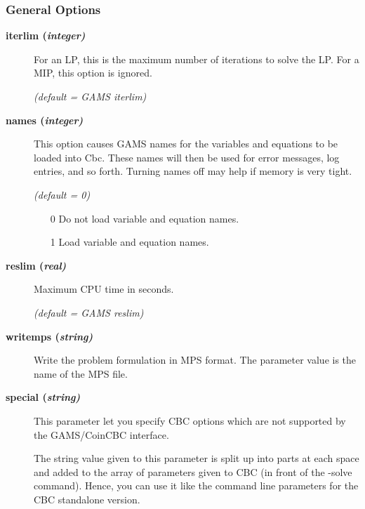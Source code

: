 \subsubsection{General Options}

\begin{description}

\item[\label{iterlim}\hypertarget{iterlim}
{\textbf{iterlim (\slshape{integer})}}]\hspace{1.0in}

For an LP, this is the maximum number of iterations to solve the LP.
For a MIP, this option is ignored.

\textsl{(default = GAMS iterlim)}

\item[\label{names}\hypertarget{names}
{\textbf{names (\slshape{integer})}}]\hspace{1.0in}

This option causes GAMS names for the variables and equations to be loaded into Cbc.
These names will then be used for error messages, log entries, and so forth.
Turning names off may help if memory is very tight.

\textsl{(default = 0)}
\begin{itemize}
\item[0] Do not load variable and equation names.
\item[1] Load variable and equation names.
\end{itemize}

\item[\label{reslim}\hypertarget{reslim}
{\textbf{reslim (\slshape{real})}}]\hspace{1.0in}

Maximum CPU time in seconds.

\textsl{(default = GAMS reslim)}

\item[\label{writemps}\hypertarget{writemps}
{\textbf{writemps (\slshape{string})}}]\hspace{1.0in}

Write the problem formulation in MPS format.
The parameter value is the name of the MPS file.

\item[\label{special}\hypertarget{special}
{\textbf{special (\slshape{string})}}]\hspace{1.0in}

This parameter let you specify CBC options which are not supported by the GAMS/CoinCBC interface.

The string value given to this parameter is split up into parts at each space and added to the array of parameters given to CBC (in front of the -solve command).
Hence, you can use it like the command line parameters for the CBC standalone version.

\end{description}

